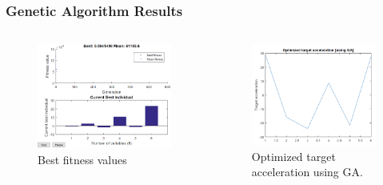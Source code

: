 \documentclass{beamer}
\begin{document}
\begin{frame}
\frametitle{Genetic Algorithm Results}
	\begin{columns}[c]
		\begin{column}{.3\linewidth}
			\begin{figure}[H]
				\centering
				\includegraphics[scale = 0.18]{fig/GApolyF.PNG}
				\caption{Best fitness values}
				\label{GA poly F}
			\end{figure}
		\end{column}
	
	\begin{column}{.3\linewidth}	
		\begin{figure}[H]
			\centering
			\includegraphics[scale = 0.18]{fig/GApolyXNT.PNG}
			\caption{Optimized target acceleration using GA.}
			\label{GA poly XNT}
		\end{figure}
	\end{column}


\end{columns}
\end{frame}
\end{document}
